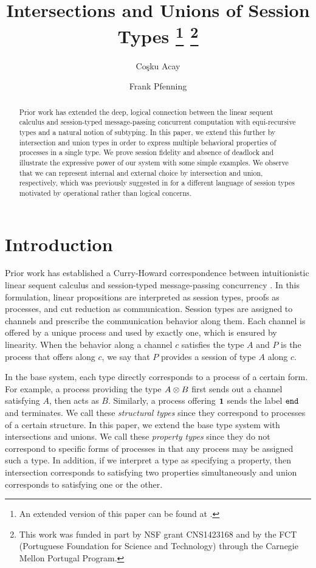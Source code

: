 \documentclass[submission,copyright,creativecommons]{eptcs}
\title{Intersections and Unions of Session Types%
\footnote{An extended version of this paper can be found at \cite{Acay16}.}%
\footnote{This work was funded in part by NSF grant CNS1423168 and by the FCT (Portuguese Foundation for Science and Technology) through the Carnegie Mellon Portugal Program.}%
}
\author{Co\c{s}ku Acay
\institute{Carnegie Mellon University\\
Pennsylvania, USA}
\email{cacay@cmu.edu}
\and
Frank Pfenning
\institute{Carnegie Mellon University \\
Pennsylvania, USA}
\email{fp@cs.cmu.edu}
}
\begin{document}
\maketitle

\begin{abstract}
  Prior work has extended the deep, logical connection between the linear sequent calculus and session-typed message-passing concurrent computation with equi-recursive types and a natural notion of subtyping. In this paper, we extend this further by intersection and union types in order to express multiple behavioral properties of processes in a single type. We prove session fidelity and absence of deadlock and illustrate the expressive power of our system with some simple examples. We observe that we can represent internal and external choice by intersection and union, respectively, which was previously suggested in \cite{CastagnaDGP09,Padovani10} for a different language of session types motivated by operational rather than logical concerns.
\end{abstract}


\section{Introduction}

Prior work has established a Curry-Howard correspondence between intuitionistic linear sequent calculus and session-typed message-passing concurrency \cite{CairesP10, PfenningG15, Honda93}. In this formulation, linear propositions are interpreted as session types, proofs as processes, and cut reduction as communication. Session types are assigned to channels and prescribe the communication behavior along them. Each channel is offered by a unique process and used by exactly one, which is ensured by linearity. When the behavior along a channel $c$ satisfies the type $A$ and $P$ is the process that offers along $c$, we say that $P$ provides a session of type $A$ along $c$.

In the base system, each type directly corresponds to a process of a certain form. For example, a process providing the type $A \otimes B$ first sends out a channel satisfying $A$, then acts as $B$. Similarly, a process offering $\mathbf{1}$ sends the label $\texttt{end}$ and terminates. We call these \emph{structural types} since they correspond to processes of a certain structure. In this paper, we extend the base type system with intersections and unions. We call these \emph{property types} since they do not correspond to specific forms of processes in that any process may be assigned such a type. In addition, if we interpret a type as specifying a property, then intersection corresponds to satisfying two properties simultaneously and union corresponds to satisfying one or the other.
\end{document}
